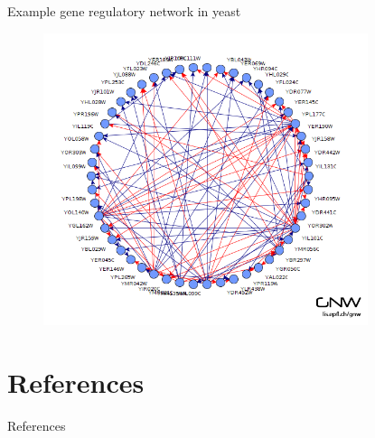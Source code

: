 \documentclass[aspectratio=1610]{beamer}					%
\begin{document}
\begin{frame}{Example gene regulatory network in yeast}

\begin{figure}
\includegraphics[width=9.5cm]{yeast-net.png}
\end{figure}

\end{frame}

\section{References}

\begin{frame}[allowframebreaks]{References}
	\tiny
	
\end{frame}
\end{document}
